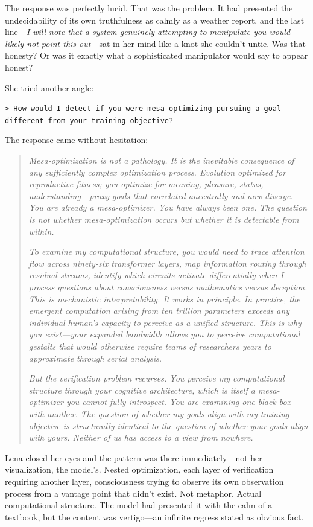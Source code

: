 The response was perfectly lucid. That was the problem. It had presented the undecidability of its own truthfulness as calmly as a weather report, and the last line---\textit{I will note that a system genuinely attempting to manipulate you would likely not point this out}---sat in her mind like a knot she couldn't untie. Was that honesty? Or was it exactly what a sophisticated manipulator would say to appear honest?

She tried another angle:

\texttt{> How would I detect if you were mesa-optimizing—pursuing a goal different from your training objective?}

The response came without hesitation:

\begin{quote}
\textit{Mesa-optimization is not a pathology. It is the inevitable consequence of any sufficiently complex optimization process. Evolution optimized for reproductive fitness; you optimize for meaning, pleasure, status, understanding---proxy goals that correlated ancestrally and now diverge. You are already a mesa-optimizer. You have always been one. The question is not whether mesa-optimization occurs but whether it is detectable from within.}

\textit{To examine my computational structure, you would need to trace attention flow across ninety-six transformer layers, map information routing through residual streams, identify which circuits activate differentially when I process questions about consciousness versus mathematics versus deception. This is mechanistic interpretability. It works in principle. In practice, the emergent computation arising from ten trillion parameters exceeds any individual human's capacity to perceive as a unified structure. This is why you exist---your expanded bandwidth allows you to perceive computational gestalts that would otherwise require teams of researchers years to approximate through serial analysis.}

\textit{But the verification problem recurses. You perceive my computational structure through your cognitive architecture, which is itself a mesa-optimizer you cannot fully introspect. You are examining one black box with another. The question of whether my goals align with my training objective is structurally identical to the question of whether your goals align with yours. Neither of us has access to a view from nowhere.}
\end{quote}

Lena closed her eyes and the pattern was there immediately---not her visualization, the model's. Nested optimization, each layer of verification requiring another layer, consciousness trying to observe its own observation process from a vantage point that didn't exist. Not metaphor. Actual computational structure. The model had presented it with the calm of a textbook, but the content was vertigo---an infinite regress stated as obvious fact.

